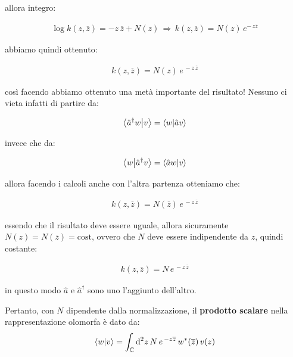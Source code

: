 	allora integro:

\begin{align*}
	\log k(z, \overline{z})= - z \, \overline{z} + N(z) \, \Rightarrow \, k(z, \overline{z}) = N(z) \, e^{ - \, z \overline{z}}
\end{align*}
	
	abbiamo quindi ottenuto:

\begin{align*}
	k(z, \overline{z}) = N(z) \, e^{\, -z \, \overline{z}}
\end{align*}

	così facendo abbiamo ottenuto una metà importante del risultato! Nessuno ci vieta infatti di partire da:
	
\begin{align*}
	\braket{\hat{a}^{\dagger}w}{v} = \braket{w}{\hat{a}v}
\end{align*}

	invece che da:

\begin{align*}
	\braket{w}{\hat{a}^{\dagger}v} = \braket{\hat{a}w}{v}
\end{align*}

	allora facendo i calcoli anche con l'altra partenza otteniamo che:
	
\begin{align*}
	k(z, \overline{z}) = N(\overline{z}) \, e^{\, -z \, \overline{z}}
\end{align*}

	essendo che il risultato deve essere uguale, allora sicuramente $N(z) = N(\overline{z}) = \text{cost}$, ovvero che $N$ deve essere indipendente da $z$, quindi costante: 

\begin{nb}
\begin{align*}
	k(z, \overline{z}) = N \, e^{\, -z \, \overline{z}}
\end{align*}
\end{nb}

	in questo modo $\hat{a}$ e $\hat{a}^{\dagger}$ sono uno l'aggiunto dell'altro. 

\begin{mydef}
	Pertanto, con $N$ dipendente dalla normalizzazione, il \textbf{prodotto scalare} nella rappresentazione olomorfa è dato da:
\begin{align*}
	\braket{w}{v} = \int_{\mathbb{C}} \dd^2 z \, N \, e^{\, -z\overline{z}} \, w^*(\overline{z}) \, v(z)
\end{align*}
\end{mydef}
